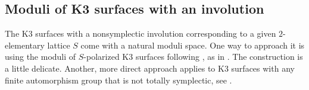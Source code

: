 \documentclass{amsart}
\begin{document}
%
%
%
%

\subsection{Moduli of K3 surfaces with an involution}
\label{sec:moduli-with-involution}
The K3 surfaces with a nonsymplectic involution corresponding to a
given $2$-elementary lattice $S$ come with a natural moduli space. One
way to approach it is using the moduli of $S$-polarized K3 surfaces
following \cite{dolgachev1996mirror-symmetry}, as in
\cite{dolgachev2007moduli-of-k3}. The construction is a little delicate. 
Another, more direct approach applies to K3 surfaces with any finite
automorphism group that is not totally symplectic, see
\cite[Sec.~2A]{alexeev2021nonsymplectic}.
\end{document}
